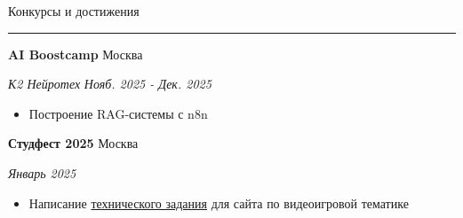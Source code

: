 \documentclass[14pt, a4paper, oneside]{extarticle}
\begin{document}

\pagebreak


\begin{flushleft}
	\vspace{-\intextsep}
	\large Конкурсы и достижения
\end{flushleft}

\vspace{-0.8\intextsep}
\hrule


\begin{flushleft}
	\vspace{-0.8\intextsep}
	\quad
	\textbf{AI Boostcamp}
	\hfill
	Москва
\end{flushleft}

\begin{flushleft}
	\vspace{-1\intextsep}
	\quad
	\textit{К2 Нейротех}
	\hfill
	\textit{\small Нояб. 2025 - Дек. 2025}
\end{flushleft}


\begin{itemize}
	\vspace{-2\intextsep}
	\item Построение RAG-системы с n8n
\end{itemize}


\begin{flushleft}
	\vspace{-0.8\intextsep}
	\quad
	\textbf{Студфест 2025}
	\hfill
	Москва
\end{flushleft}

\begin{flushleft}
	\vspace{-1\intextsep}
	\quad
	\hfill
	\textit{\small Январь 2025}
\end{flushleft}


\begin{itemize}
	\vspace{-2\intextsep}
	\item Написание \href{https://github.com/Crazy5202/job_application_form/tree/main/portfolio/OnlyGames%5B%D0%A2ex_%D0%97%D0%B0%D0%B4%D0%B0%D0%BD%D0%B8%D0%B5%5D.pdf}{технического задания} для сайта по видеоигровой тематике
\end{itemize}
\end{document}
